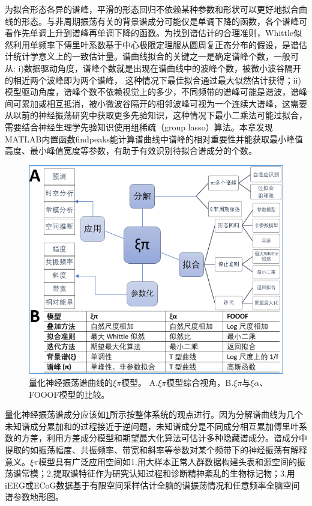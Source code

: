 为拟合形态各异的谱峰，平滑的形态回归不依赖某种参数和形状可以更好地拟合曲线的形态。与非周期振荡有关的背景谱成分可能仅是单调下降的函数，各个谱峰可看作先单调上升到谱峰再单调下降的函数。为找到谱估计的合理准则，Whittle似然利用单频率下傅里叶系数基于中心极限定理服从圆周复正态分布的假设，是谱估计统计学意义上的一致估计量。谱曲线拟合的关键之一是确定谱峰个数，一般可从: i)数据驱动角度，谱峰个数就是出现在谱曲线中的波峰个数，被微小波谷隔开的相近两个波峰即为两个谱峰，
这种情况下最佳拟合通过最大似然估计获得；ii)模型驱动角度，谱峰个数不依赖视觉上的多少，不同频带的谱峰可能是谐波，谱峰间可累加或相互抵消，被小微波谷隔开的相邻波峰可视为一个连续大谱峰，这需要从以前的神经振荡研究中获取更多先验知识，这种情况下最小二乘法可能过拟合，需要结合神经生理学先验知识使用组稀疏（group lasso）算法。本章发现MATLAB内置函数findpeaks能计算谱曲线中谱峰的相对重要性并能获取最小峰值高度、最小峰值宽度等参数，有助于有效识别待拟合谱成分的个数。

\begin{figure}[!h]
\includegraphics[width=15cm]{pic/xipi/model.png}
\caption{量化神经振荡谱曲线的$\xi\pi$模型。 A.$\xi\pi$模型综合视角，B.$\xi\pi$与$\xi\alpha$、FOOOF模型的比较。}
\label{7:model}
\end{figure}

量化神经振荡谱成分应该如\ref{7:model}所示按整体系统的观点进行。因为分解谱曲线为几个未知谱成分累加和的过程接近于逆问题，未知谱成分是不同成分相互累加傅里叶系数的方差，利用方差成分模型和期望最大化算法可估计多种隐藏谱成分。谱成分中提取的如振荡幅度、共振频率、带宽和斜率等参数对某个频带下的神经振荡有解释意义。$\xi\pi$模型具有广泛应用空间如1.用大样本正常人群数据构建头表和源空间的振荡谱常模；2.提取谱特征作为研究认知过程和诊断精神紊乱的生物标记物；3.用iEEG或ECoG数据基于有限空间采样估计全脑的谱振荡情况和任意频率全脑空间谱参数地形图。


